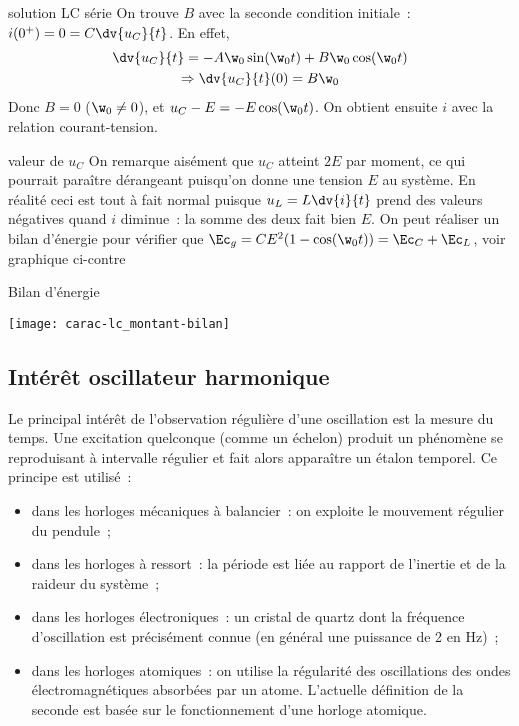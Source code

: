 \documentclass[../main/main.tex]{subfiles}
\begin{document}
\begin{tcbraster}[raster columns=2, raster equal height=rows]
\begin{demo}[label=demo:rcsolu]{solution LC série}
        On trouve $B$ avec la seconde condition initiale~: $i(0^+) = 0 = C
        \dv{u_C}{t}$. En effet,
        \begin{gather*}
            \dv{u_C}{t} = -A\w_0\sin(\w_0t) + B\w_0\cos(\w_0t)\\
            \Rightarrow \dv{u_C}{t} (0) = B\w_0
        \end{gather*}
        Donc $B = 0$ ($\w_0 \neq 0$), et $u_C - E = -E\cos(\w_0t)$. On obtient
        ensuite $i$ avec la relation courant-tension.
    \end{demo}
    \begin{rema}[label=rema:lccharge]{valeur de $u_C$}
        On remarque aisément que $u_C$ atteint $2E$ par moment, ce qui pourrait
        paraître dérangeant puisqu'on donne une tension $E$ au système. En
        réalité ceci est tout à fait normal puisque $u_L = L\dv{i}{t}$ prend des
        valeurs négatives quand $i$ diminue~: la somme des deux fait bien $E$.
        On peut réaliser un bilan d'énergie pour vérifier que $\Ec_g =
        CE^2(1-\cos(\w_0t)) = \Ec_C + \Ec_L$, voir graphique ci-contre
    \end{rema}
    \begin{NCexem}[width=\linewidth]{Bilan d'énergie}
        \begin{center}
            \texttt{[image: carac-lc\_montant-bilan]}
        \end{center}
    \end{NCexem}
\end{tcbraster}

\subsection{Intérêt oscillateur harmonique}

Le principal intérêt de l'observation régulière d'une oscillation est la mesure
du temps. Une excitation quelconque (comme un échelon) produit un phénomène se
reproduisant à intervalle régulier et fait alors apparaître un étalon
temporel. Ce principe est utilisé~:
\begin{itemize}
    \item dans les horloges mécaniques à balancier~: on exploite le mouvement
        régulier du pendule~;
    \item dans les horloges à ressort~: la période est liée au rapport de
        l'inertie et de la raideur du système~;
    \item dans les horloges électroniques~: un cristal de quartz dont la
        fréquence d'oscillation est précisément connue (en général une puissance
        de 2 en Hz)~;
    \item dans les horloges atomiques~: on utilise la régularité des
        oscillations des ondes électromagnétiques absorbées par un atome.
        L'actuelle définition de la seconde est basée sur le fonctionnement
        d'une horloge atomique.
\end{itemize}
\end{document}
